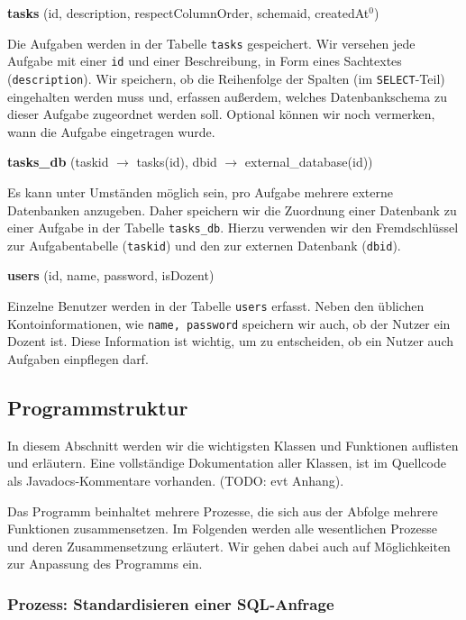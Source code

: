 \textbf{tasks} (id, description, respectColumnOrder, schemaid, createdAt$^0$)

Die Aufgaben werden in der Tabelle \verb|tasks| gespeichert. Wir versehen jede Aufgabe mit einer \verb|id| und einer Beschreibung, in Form eines Sachtextes (\verb|description|). Wir speichern, ob die Reihenfolge der Spalten (im \verb|SELECT|-Teil) eingehalten werden muss und, erfassen außerdem, welches Datenbankschema zu dieser Aufgabe zugeordnet werden soll. Optional können wir noch vermerken, wann die Aufgabe eingetragen wurde.

\textbf{tasks\_db} (taskid $\to$ tasks(id), dbid $\to$ external\_database(id))

Es kann unter Umständen möglich sein, pro Aufgabe mehrere externe Datenbanken anzugeben. Daher speichern wir die Zuordnung einer Datenbank zu einer Aufgabe in der Tabelle \verb|tasks_db|. Hierzu verwenden wir den Fremdschlüssel zur Aufgabentabelle (\verb|taskid|) und den zur externen Datenbank (\verb|dbid|).

\textbf{users} (id, name, password, isDozent)

Einzelne Benutzer werden in der Tabelle \verb|users| erfasst. Neben den üblichen Kontoinformationen, wie \verb|name, password| speichern wir auch, ob der Nutzer ein Dozent ist. Diese Information ist wichtig, um zu entscheiden, ob ein Nutzer auch Aufgaben einpflegen darf.

\subsection{Programmstruktur}

In diesem Abschnitt werden wir die wichtigsten Klassen und Funktionen auflisten und erläutern. Eine vollständige Dokumentation aller Klassen, ist im Quellcode als Javadocs-Kommentare vorhanden. (TODO: evt Anhang).

Das Programm beinhaltet mehrere Prozesse, die sich aus der Abfolge mehrere Funktionen zusammensetzen. Im Folgenden werden alle wesentlichen Prozesse und deren Zusammensetzung erläutert. Wir gehen dabei auch auf Möglichkeiten zur Anpassung des Programms ein.

\subsubsection{Prozess: Standardisieren einer SQL-Anfrage} 

